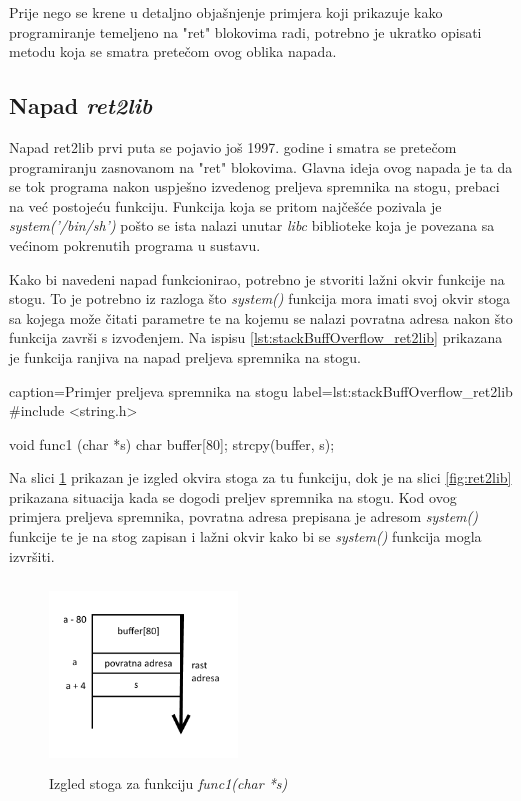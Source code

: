 \documentclass[times, utf8, diplomski, numeric]{fer}
\begin{document}
Prije nego se krene u detaljno objašnjenje primjera koji
prikazuje kako programiranje temeljeno na "ret" blokovima radi,
potrebno je ukratko opisati metodu koja se smatra pretečom ovog
oblika napada.

\subsection{Napad \emph{ret2lib}}

Napad ret2lib prvi puta se pojavio još 1997. godine
\citep{ret2lib_official} i smatra se pretečom programiranju
zasnovanom na "ret" blokovima. Glavna ideja ovog napada je ta da
se tok programa nakon uspješno izvedenog preljeva spremnika na
stogu, prebaci na već postojeću funkciju. Funkcija koja se pritom
najčešće pozivala je \emph{system('/bin/sh')} pošto se ista
nalazi unutar \emph{libc} biblioteke koja je povezana sa većinom
pokrenutih programa u sustavu.

Kako bi navedeni napad funkcionirao, potrebno je stvoriti lažni
okvir funkcije na stogu. To je potrebno iz razloga što
\emph{system()} funkcija mora imati svoj okvir stoga sa kojega
može čitati parametre te na kojemu se nalazi povratna adresa
nakon što funkcija završi s izvođenjem. Na ispisu 
\ref{lst:stackBuffOverflow_ret2lib} prikazana je funkcija ranjiva
na napad preljeva spremnika na stogu.

\begin{ispis} {caption=Primjer preljeva spremnika na stogu} {label=lst:stackBuffOverflow_ret2lib}
#include <string.h>
 
void func1 (char *s)
{
	char buffer[80];
	strcpy(buffer, s);
}

\end{ispis}

Na slici \ref{fig:ret2lib_stackFrame} prikazan je izgled okvira
stoga za tu funkciju, dok je na slici \ref{fig:ret2lib} prikazana
situacija kada se dogodi preljev spremnika na stogu. Kod ovog
primjera preljeva spremnika, povratna adresa prepisana je adresom
\emph{system()} funkcije te je na stog zapisan i lažni okvir kako
bi se \emph{system()} funkcija mogla izvršiti.  


\begin{figure}[!htb]
\centering
\setlength\fboxsep{0pt}
\setlength\fboxrule{0.5pt}
\includegraphics[width=5cm, height=5cm]{slike/ret2lib_stackFrame}
\caption{Izgled stoga za funkciju \emph{func1(char *s)}}
\label{fig:ret2lib_stackFrame} 
\end{figure}
\end{document}
